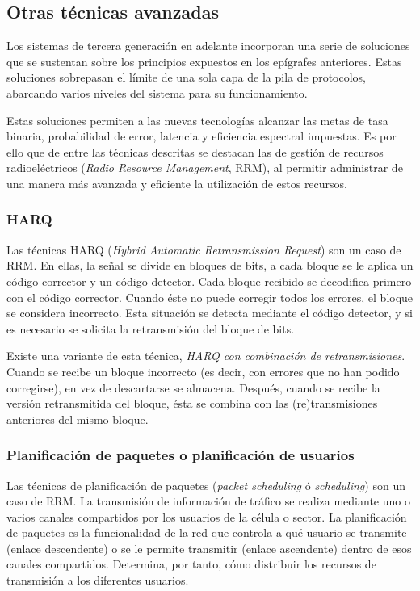 \documentclass[12pt]{report} %
\begin{document}
\subsection{Otras técnicas avanzadas}

Los sistemas de tercera generación en adelante incorporan una serie de soluciones que se sustentan sobre los principios expuestos en los epígrafes anteriores.
Estas soluciones sobrepasan el límite de una sola capa de la pila de protocolos, abarcando varios niveles del sistema para su funcionamiento.

Estas soluciones permiten a las nuevas tecnologías alcanzar las metas de tasa binaria, probabilidad de error, latencia y eficiencia espectral impuestas.
Es por ello que de entre las técnicas descritas se destacan las de gestión de recursos radioeléctricos (\textit{Radio Resource Management}, RRM),
al permitir administrar de una manera más avanzada y eficiente la utilización de estos recursos.

\subsubsection{HARQ}

Las técnicas HARQ (\textit{Hybrid Automatic Retransmission Request}) son un caso de RRM.
En ellas, la señal se divide en bloques de bits, a cada bloque se le aplica un código corrector y un código detector.
Cada bloque recibido se decodifica primero con el código corrector.
Cuando éste no puede corregir todos los errores, el bloque se considera incorrecto.
Esta situación se detecta mediante el código detector, y si es necesario se solicita la retransmisión del bloque de bits.
\cite{RefWorks:26, RefWorks:80}

Existe una variante de esta técnica, \textit{HARQ con combinación de retransmisiones}.
Cuando se recibe un bloque incorrecto (es decir, con errores que no han podido corregirse), en vez de descartarse se almacena.
Después, cuando se recibe la versión retransmitida del bloque, ésta se combina con las (re)transmisiones anteriores del mismo bloque.
\cite{RefWorks:26, RefWorks:80}

\subsubsection{Planificación de paquetes o planificación de usuarios}

Las técnicas de planificación de paquetes (\textit{packet scheduling} ó \textit{scheduling}) son un caso de RRM.
La transmisión de información de tráfico se realiza mediante uno o varios canales compartidos por los usuarios de la célula o sector.
La planificación de paquetes es la funcionalidad de la red que controla a qué usuario se transmite (enlace descendente) o se le permite transmitir (enlace ascendente) dentro de esos canales compartidos.
Determina, por tanto, cómo distribuir los recursos de transmisión a los diferentes usuarios.
\cite{RefWorks:80}
\end{document}
